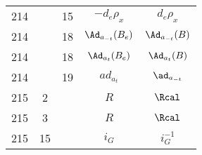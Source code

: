 \documentclass[a4paper,11pt]{article}
\numberwithin{equation}{section}
\begin{document}
\begin{center}
\begin{tabular}{|c|c|c|c|c|}
    214 & & 15 & $-d_{ e }\rho_{ x }$ & $d_{ e }\rho_{ x }$ \\
    214 & & 18 & $\Ad_{ a_{ -t } }( B_{ e } )$
           & $\Ad_{ a_{ -t } }( B )$ \\
    214 & & 18 & $\Ad_{ a_{ t } }( B_{ e } )$ & $\Ad_{ a_{ t } }( B )$ \\
    214 & & 19 & $ad_{ a_{ t } }$ & $\ad_{ a_{ -t } }$ \\
    215 & \hphantom{0}2 & & $R$ & $\Rcal$ \\
    215 & \hphantom{0}3 & & $R$ & $\Rcal$ \\
    215 & 15 & & $i_{ G }$ & $i_{ G }^{ -1 }$ \\
    \hline
  \end{tabular}





  \newpage


\end{center}
\end{document}
